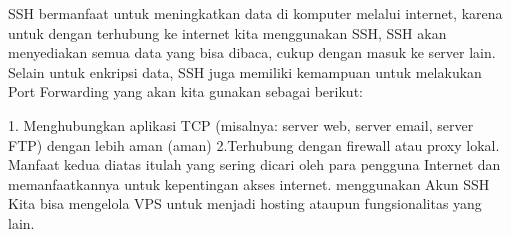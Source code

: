 SSH bermanfaat untuk meningkatkan data di komputer melalui internet, karena untuk dengan terhubung ke internet kita menggunakan SSH, SSH akan menyediakan semua data yang bisa dibaca, cukup dengan masuk ke server lain.
Selain untuk enkripsi data, SSH juga memiliki kemampuan untuk melakukan Port Forwarding yang akan kita gunakan sebagai berikut:

1. Menghubungkan aplikasi TCP (misalnya: server web, server email, server FTP) dengan lebih aman (aman)
2.Terhubung dengan firewall atau proxy lokal.
Manfaat kedua diatas itulah yang sering dicari oleh para pengguna Internet dan memanfaatkannya untuk kepentingan akses internet. menggunakan Akun SSH Kita bisa mengelola VPS untuk menjadi hosting ataupun fungsionalitas yang lain.


